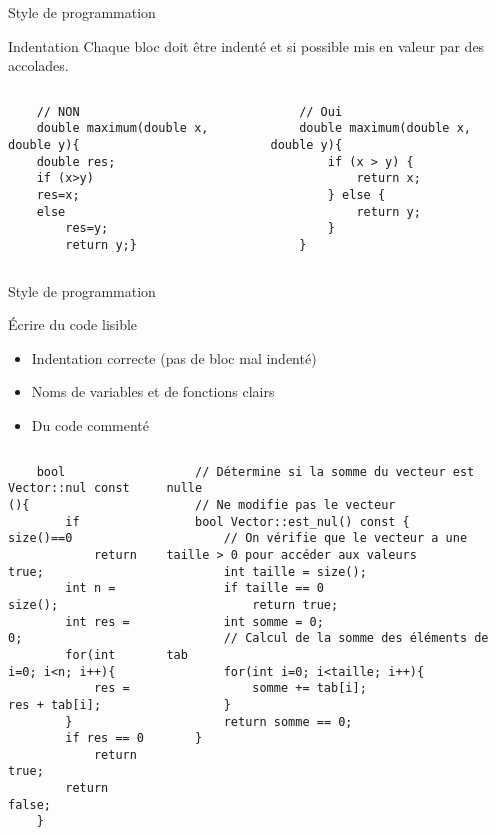 \documentclass{beamer}
\begin{document}
\begin{frame}[fragile]{Style de programmation}
\begin{block}{Indentation}
Chaque bloc doit être indenté et si possible mis en valeur par des accolades.
\end{block}

\begin{columns}
    \begin{column}{0.5\textwidth}
    \begin{verbatim}
    // NON
    double maximum(double x, double y){
    double res;
    if (x>y)
    res=x;
    else
        res=y;
        return y;}
    \end{verbatim}
    \end{column}
    \begin{column}{0.5\textwidth}
    \begin{verbatim}
    // Oui
    double maximum(double x, double y){
        if (x > y) {
            return x;
        } else {
            return y;
        }
    }
    \end{verbatim}
    \end{column}
\end{columns}
\end{frame}

\begin{frame}[fragile]{Style de programmation}

\begin{block}{Écrire du code lisible}
\begin{itemize}
    \item Indentation correcte (pas de bloc mal indenté)
    \item Noms de variables et de fonctions clairs
    \item Du code commenté
\end{itemize}
\end{block}

\begin{columns}
    \begin{column}{0.4\textwidth}
    \begin{verbatim}
    bool Vector::nul const (){
        if size()==0
            return true;
        int n = size();
        int res = 0;
        for(int i=0; i<n; i++){
            res = res + tab[i];
        }
        if res == 0
            return true;
        return false;
    }
    \end{verbatim}
    \end{column}
    \begin{column}{0.6\textwidth}
    \begin{verbatim}
    // Détermine si la somme du vecteur est nulle
    // Ne modifie pas le vecteur
    bool Vector::est_nul() const {
        // On vérifie que le vecteur a une taille > 0 pour accéder aux valeurs
        int taille = size();
        if taille == 0
            return true;
        int somme = 0;
        // Calcul de la somme des éléments de tab
        for(int i=0; i<taille; i++){
            somme += tab[i];
        }
        return somme == 0;
    }
    \end{verbatim}
    \end{column}
\end{columns}
\end{frame}
\end{document}
